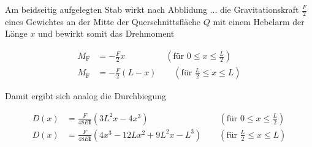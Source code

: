 Am beidseitig aufgelegten Stab wirkt nach Abblidung ... die Gravitationskraft
$\frac{F}{2}$ eines Gewichtes an der Mitte der Querschnittsfläche $Q$ mit einem
Hebelarm der Länge $x$ und bewirkt somit das Drehmoment

\begin{align}
    M_\text{F} &= - \frac{F}{2} x \qquad \qquad \; \; \,
    (\text{für } 0 \leq x \leq \frac{L}{2})\\
    M_\text{F} &= - \frac{F}{2} (L - x) \qquad (\text{für } \frac{L}{2} \leq x \leq L)
\end{align}

Damit ergibt sich analog die Durchbiegung

\begin{align}
    D(x) &= \frac{F}{48 E \symbf{I}} \left(3 L^2 x - 4 x^3 \right) 
    \qquad \qquad \qquad \qquad \: (\text{für } 0 \leq x \leq \frac{L}{2}) \\
    D(x) &= \frac{F}{48 E \symbf{I}} \left(4 x^3 - 12 L x^2 + 9 L^2 x - L^3 \right) 
    \qquad (\text{für } \frac{L}{2} \leq x \leq L)
\end{align}












